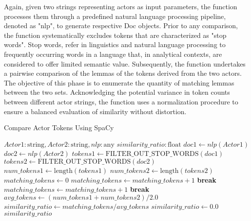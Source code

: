 Again, given two strings representing actors as input parameters, the function processes them through a predefined natural language processing pipeline, denoted as "nlp", to generate respective Doc objects. Prior to any comparison, the function systematically excludes tokens that are characterized as "stop words". Stop words, refer in linguistics and natural language processing to frequently occurring words in a language that, in analytical contexts, are considered to offer limited semantic value. Subsequently, the function undertakes a pairwise comparison of the lemmas of the tokens derived from the two actors. The objective of this phase is to enumerate the quantity of matching lemmas between the two sets. Acknowledging the potential variance in token counts between different actor strings, the function uses a normalization procedure to ensure a balanced evaluation of similarity without distortion.

\begin{algorithm}
    \caption{Compare Actor Tokens Using SpaCy}
    \begin{algorithmic}[1]
        \REQUIRE $Actor1: \text{string},  Actor2: \text{string}, nlp: \text{any}$
        \ENSURE $similarity\_ratio: \text{float}$
            \STATE $doc1 \gets nlp(Actor1)$
            \STATE $doc2 \gets nlp(Actor2)$
            \STATE $tokens1 \gets \text{FILTER\_OUT\_STOP\_WORDS}(doc1)$
            \STATE $tokens2 \gets \text{FILTER\_OUT\_STOP\_WORDS}(doc2)$
            \STATE $num\_tokens1 \gets \text{length}(tokens1)$
            \STATE $num\_tokens2 \gets \text{length}(tokens2)$
            \STATE $matching\_tokens \gets 0$
                            \STATE $matching\_tokens \gets matching\_tokens + 1$
                            \STATE \textbf{break}
                        \ENDIF
                    \ENDFOR
                \ENDFOR
            \ELSE
                            \STATE $matching\_tokens \gets matching\_tokens + 1$
                            \STATE \textbf{break}
                        \ENDIF
                    \ENDFOR
                \ENDFOR
            \ENDIF
            \STATE $avg\_tokens \gets (num\_tokens1 + num\_tokens2) / 2.0$
                \STATE $similarity\_ratio \gets matching\_tokens / avg\_tokens$
            \ELSE
                \STATE $similarity\_ratio \gets 0.0$
            \ENDIF
            \RETURN $similarity\_ratio$
        \ENDFUNCTION
    \end{algorithmic}
\end{algorithm}








